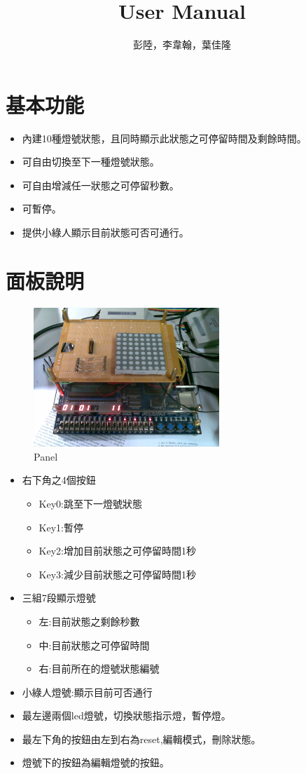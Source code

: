 \documentclass[11pt,a4paper]{article}
\title{User Manual}
\author{彭陸，李韋翰，葉佳隆}
\date{}
\begin{document}
\maketitle
\section{基本功能}
\begin{itemize}
\item 內建10種燈號狀態，且同時顯示此狀態之可停留時間及剩餘時間。
\item 可自由切換至下一種燈號狀態。
\item 可自由增減任一狀態之可停留秒數。
\item 可暫停。
\item 提供小綠人顯示目前狀態可否可通行。
\end{itemize}

\section{面板說明}
\begin{figure}[H]
  \centering
  \includegraphics[width=7cm]{panel}
  \caption{Panel}
\end{figure}
\begin{multicols}{2}
\begin{itemize}
\item 右下角之4個按鈕
  \begin{itemize}
\item Key0:跳至下一燈號狀態
\item Key1:暫停
\item Key2:增加目前狀態之可停留時間1秒
\item Key3:減少目前狀態之可停留時間1秒
  \end{itemize}

\item 三組7段顯示燈號
  \begin{itemize}
    \item 左:目前狀態之剩餘秒數
    \item 中:目前狀態之可停留時間
    \item 右:目前所在的燈號狀態編號  
  \end{itemize}
\item 小綠人燈號:顯示目前可否通行
\item 最左邊兩個led燈號，切換狀態指示燈，暫停燈。
\item 最左下角的按鈕由左到右為reset,編輯模式，刪除狀態。
\item 燈號下的按鈕為編輯燈號的按鈕。
\end{itemize}  
\end{multicols}
\end{document}
